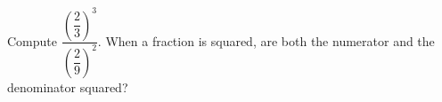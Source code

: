 Compute $\dfrac{\left(\dfrac{2}{3}\right)^3}{\left(\dfrac{2}{9}\right)^2}$. When a fraction is squared, are both the numerator and the denominator squared?
